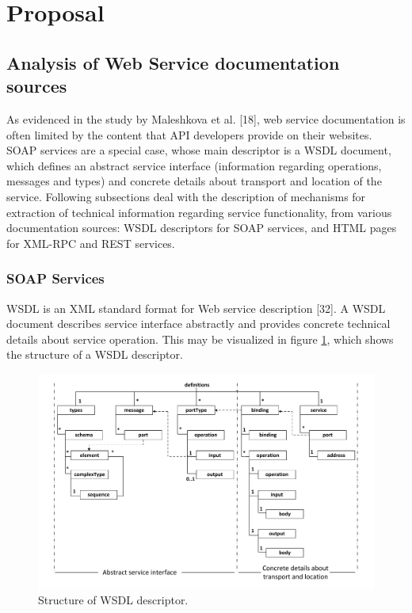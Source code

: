 \section{Proposal}

\subsection{Analysis of Web Service documentation sources}
\label{subsec:analysis-ws-doc}
As evidenced in the study by Maleshkova et al. [18], web service documentation is often limited by the content that API developers provide on their websites. SOAP services are a special case, whose main descriptor is a WSDL document, which defines an abstract service interface (information regarding operations, messages and types) and concrete details about transport and location of the service. Following subsections deal with the description of mechanisms for extraction of technical information regarding service functionality, from various documentation sources: WSDL descriptors for SOAP services, and HTML pages for XML-RPC and REST services.

\subsubsection{SOAP Services}
\label{subsubsec:soap}
WSDL is an XML standard format for Web service description [32]. A WSDL document describes service interface abstractly and provides concrete technical details about service operation. This may be visualized in figure \ref{wsdl-Structure}, which shows the structure of a WSDL descriptor.

\begin{figure}
\includegraphics[scale=0.45]{images/wsdl-structure-en}

\caption{Structure of WSDL descriptor.}
\label{wsdl-Structure}
\end{figure}

